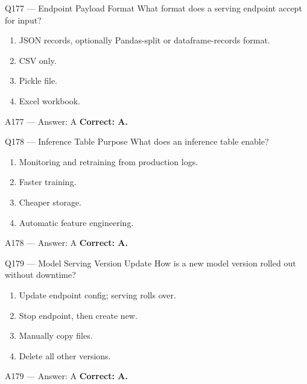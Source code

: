 \documentclass[aspectratio=169,9pt]{beamer}
\begin{document}
	\begin{frame}{Q177 --- Endpoint Payload Format}
		What format does a serving endpoint accept for input?
		\begin{enumerate}[label=\Alph*.]
			\item JSON records, optionally Pandas-split or dataframe-records format.
			\item CSV only.
			\item Pickle file.
			\item Excel workbook.
		\end{enumerate}
	\end{frame}
	
	\begin{frame}{A177 --- Answer: A}
		\textbf{Correct: A.}
	\end{frame}
	
	\begin{frame}{Q178 --- Inference Table Purpose}
		What does an inference table enable?
		\begin{enumerate}[label=\Alph*.]
			\item Monitoring and retraining from production logs.
			\item Faster training.
			\item Cheaper storage.
			\item Automatic feature engineering.
		\end{enumerate}
	\end{frame}
	
	\begin{frame}{A178 --- Answer: A}
		\textbf{Correct: A.}
	\end{frame}
	
	\begin{frame}{Q179 --- Model Serving Version Update}
		How is a new model version rolled out without downtime?
		\begin{enumerate}[label=\Alph*.]
			\item Update endpoint config; serving rolls over.
			\item Stop endpoint, then create new.
			\item Manually copy files.
			\item Delete all other versions.
		\end{enumerate}
	\end{frame}
	
	\begin{frame}{A179 --- Answer: A}
		\textbf{Correct: A.}
	\end{frame}
	
\end{document}
